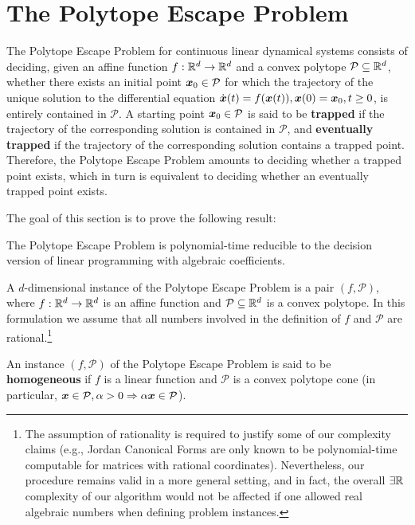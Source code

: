 \section{The Polytope Escape Problem}

The Polytope Escape Problem for continuous linear dynamical systems
consists of deciding, given an affine function
$f:\mathbb{R}^{d}\rightarrow \mathbb{R}^{d}$ and a convex polytope
$\mathcal{P}\subseteq\mathbb{R}^d$, whether there exists an initial point
$\boldsymbol{x}_{0} \in \mathcal{P}$ for which the trajectory of the unique
solution to the differential equation
$\dot{\boldsymbol{x}}(t)=f(\boldsymbol{x}(t)),\boldsymbol{x}(0)=\boldsymbol{x}_{0},
t\geq 0$,
is entirely contained in $\mathcal{P}$.  A starting point
$\boldsymbol{x}_{0}\in\mathcal{P}$ is said to be \textbf{trapped} if
the trajectory of the corresponding solution is contained in $\mathcal{P}$,
and \textbf{eventually trapped} if the trajectory of the corresponding
solution contains a trapped point. Therefore, the Polytope Escape
Problem amounts to deciding whether a trapped point exists, which in
turn is equivalent to deciding whether an eventually trapped point exists.

The goal of this section is to prove the following result:

\begin{theorem}
  The Polytope Escape Problem is polynomial-time reducible to the
  decision version of linear programming with algebraic coefficients.
\end{theorem}

A $d$-dimensional instance of the Polytope Escape Problem is a pair
$(f,\mathcal{P})$, where $f:\mathbb{R}^{d}\rightarrow \mathbb{R}^{d}$
is an affine function and $\mathcal{P}\subseteq\mathbb{R}^{d}$ is a
convex polytope. In this formulation we assume that all numbers
involved in the definition of $f$ and $\mathcal{P}$ are
rational.\footnote{The assumption of rationality is required to
  justify some of our complexity claims (e.g., Jordan Canonical Forms
  are only known to be polynomial-time computable for matrices with
  rational coordinates). Nevertheless, our procedure remains valid in
  a more general setting, and in fact, the overall
  $\exists \mathbb{R}$ complexity of our algorithm would not be
  affected if one allowed real algebraic numbers when defining problem
  instances.}

An instance $(f,\mathcal{P})$ of the Polytope Escape Problem is said
to be \textbf{homogeneous} if $f$ is a linear function and
$\mathcal{P}$ is a convex polytope cone (in particular,
$\boldsymbol{x}\in\mathcal{P},\alpha>0\Rightarrow \alpha\boldsymbol{x}
\in\mathcal{P}$).

